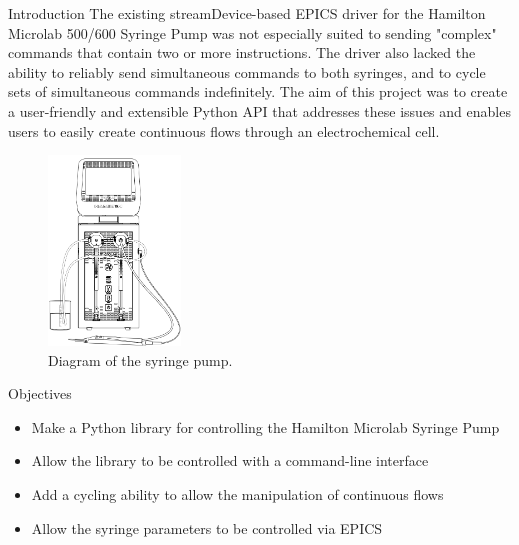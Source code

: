 \documentclass[a0paper,landscape,fontscale=0.32]{baposter}
\begin{document}
\begin{poster}
\begin{posterbox}[name=introduction,column=0]{Introduction}
The existing streamDevice-based EPICS driver for the Hamilton Microlab 500/600 Syringe Pump was not
especially suited to sending "complex" commands that contain two or more instructions.
The driver also lacked the ability to reliably send simultaneous commands to both syringes, and to
cycle sets of simultaneous commands indefinitely. The aim of this project was to create a user-friendly
and extensible Python API that addresses these issues and enables users to easily create continuous flows
through an electrochemical cell.
\begin{figure}[H]
\begin{center}
\includegraphics[width=100pt]{images/syringediagram}
\caption{Diagram of the syringe pump.}
\end{center}
\end{figure}
\end{posterbox}
\begin{posterbox}[name=objectives,column=0,row=0,below=introduction]{Objectives}
 \begin{itemize}
    \item Make a Python library for controlling the Hamilton Microlab Syringe Pump
    \item Allow the library to be controlled with a command-line interface
    \item Add a cycling ability to allow the manipulation of continuous flows
    \item Allow the syringe parameters to be controlled via EPICS

\end{itemize}
\end{posterbox}
\end{poster}
\end{document}
